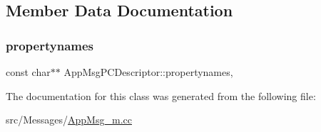 \subsection{Member Data Documentation}
\mbox{\label{class_app_msg_p_c_descriptor_aaeca386eddf80dd71ff4cdd3bb1353a7}} 
\subsubsection{\texorpdfstring{propertynames}{propertynames}}
{\footnotesize\ttfamily const char$\ast$$\ast$ App\+Msg\+P\+C\+Descriptor\+::propertynames\hspace{0.3cm}{\ttfamily [mutable]}, {\ttfamily [private]}}



The documentation for this class was generated from the following file\+:\begin{DoxyCompactItemize}
\item 
src/\+Messages/\hyperlink{_app_msg__m_8cc}{App\+Msg\+\_\+m.\+cc}\end{DoxyCompactItemize}
